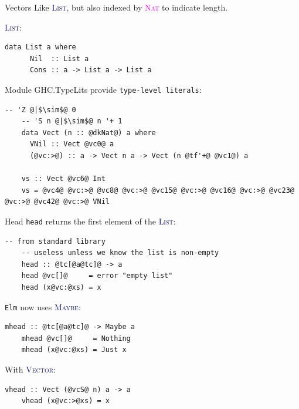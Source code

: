 \documentclass[xcolor={usenames,dvipsnames}]{beamer}
\newcommand{\htycon}[1]{\textcolor{MidnightBlue}{\textsc{#1}}}
\newcommand{\hkind}[1]{\textcolor{Fuchsia}{\textsc{#1}}}
\begin{document}
\begin{frame}[fragile]{Vectors}
  Like \htycon{List}, but also indexed by \hkind{Nat} to indicate length.

  \htycon{List}:
  \begin{lstlisting}[style=hask]
    data List a where
      Nil  :: List a
      Cons :: a -> List a -> List a
  \end{lstlisting}

  Module GHC.TypeLits provide \texttt{type-level literals}:
  \begin{lstlisting}[style=hask]
    -- 'Z @|$\sim$@ 0
    -- 'S n @|$\sim$@ n '+ 1
    data Vect (n :: @dkNat@) a where
      VNil :: Vect @vc0@ a
      (@vc:>@) :: a -> Vect n a -> Vect (n @tf'+@ @vc1@) a

    vs :: Vect @vc6@ Int
    vs = @vc4@ @vc:>@ @vc8@ @vc:>@ @vc15@ @vc:>@ @vc16@ @vc:>@ @vc23@ @vc:>@ @vc42@ @vc:>@ VNil
  \end{lstlisting}
\end{frame}

\begin{frame}[fragile]{Head}
  \texttt{head} returns the first element of the \htycon{List}:
  \begin{lstlisting}[style=hask]
    -- from standard library
    -- useless unless we know the list is non-empty
    head :: @tc[@a@tc]@ -> a
    head @vc[]@     = error "empty list"
    head (x@vc:@xs) = x
  \end{lstlisting}

  \pause
  \texttt{Elm} now uses \htycon{Maybe}:
  \begin{lstlisting}[style=hask]
    mhead :: @tc[@a@tc]@ -> Maybe a
    mhead @vc[]@     = Nothing
    mhead (x@vc:@xs) = Just x
  \end{lstlisting}

  \pause
  With \htycon{Vector}:
  \begin{lstlisting}[style=hask]
    vhead :: Vect (@vcS@ n) a -> a
    vhead (x@vc:>@xs) = x
  \end{lstlisting}
\end{frame}
\end{document}
